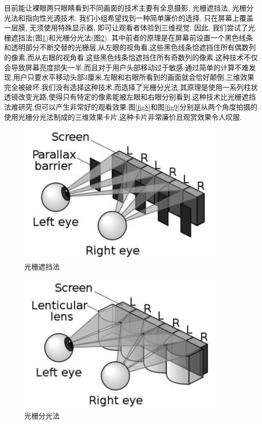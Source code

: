 \documentclass[a4paper, 11pt]{article}
\begin{document}
\begin{CJK}{UTF8}{gbsn}
目前能让裸眼两只眼睛看到不同画面的技术主要有全息摄影, 光栅遮挡法, 光栅分光法和指向性光源技术. 我们小组希望找到一种简单廉价的选择, 只在屏幕上覆盖一层膜, 无须使用特殊显示器, 即可让观看者体验到三维视觉. 因此, 我们尝试了光栅遮挡法(图\ref{fig6})和光栅分光法(图\ref{fig7}). 其中前者的原理是在屏幕前设置一个黑色线条和透明部分不断交替的光栅层,从左眼的视角看,这些黑色线条恰遮挡住所有偶数列的像素,而从右眼的视角看,这些黑色线条恰遮挡住所有奇数列的像素.这种技术不仅会导致屏幕亮度损失一半,而且对于用户头部移动过于敏感.通过简单的计算不难发现,用户只要水平移动头部3厘米,左眼和右眼所看到的画面就会恰好颠倒,三维效果完全被破坏.我们没有选择这种技术,而选择了光栅分光法.其原理是使用一系列柱状透镜改变光路,使得只有特定的像素能被左眼和右眼分别看到.这种技术比光栅遮挡法难研究,但可以产生非常好的观看效果.图\ref{fig8}和图\ref{fig9}分别是从两个角度拍摄的使用光栅分光法制成的三维效果卡片,这种卡片非常廉价且观赏效果令人叹服.
\begin{figure}[h!]
  \centerline{\includegraphics[width=10cm]{6.png}}
  \caption{光栅遮挡法}
  \label{fig6}
\end{figure}
\begin{figure}[h!]
  \centerline{\includegraphics[width=10cm]{7.png}}
  \caption{光栅分光法}
  \label{fig7}
\end{figure}


\end{CJK}
\end{document}
